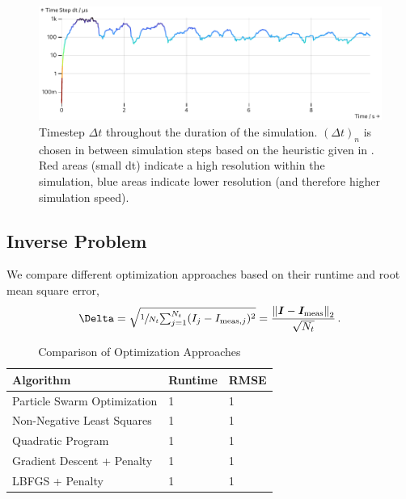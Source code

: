 \documentclass[USenglish,twocolumn]{article}
\begin{document}
  \begin{figure}
    \includegraphics[width=\columnwidth]{../figures/results/dt-plot.pdf}
    \caption{Timestep $\Delta t$ throughout the duration of the simulation. $(\Delta t)_n$ is chosen in between simulation steps based on the heuristic given in . Red areas (small dt) indicate a high resolution within the simulation, blue areas indicate lower resolution (and therefore higher simulation speed).}
    \label{figure:dt-plot}
  \end{figure}

  \subsection{Inverse Problem}
  We compare different optimization approaches based on their runtime and root mean square error,
  $$\Delta = \sqrt{\sfrac{1}{N_t} {\textstyle \sum_{j=1}^{N_t}} (I_j - I_{{\rm meas}, j})^2} = \frac{\norm{\vec{I} - \vec{I}_{\rm meas}}_2}{\sqrt{N_t}}\,.$$

  \begin{table}
    \caption{Comparison of Optimization Approaches}
    \begin{tabular}{lll}
      \textbf{Algorithm}                          & \textbf{Runtime} & \textbf{RMSE} \\
      \midrule
      Particle Swarm Optimization                 & 1                & 1             \\
      Non-Negative Least Squares \cite{1997-nnls} & 1                & 1             \\
      Quadratic Program                           & 1                & 1             \\
      Gradient Descent + Penalty                  & 1                & 1             \\
      LBFGS + Penalty                             & 1                & 1             \\
    \end{tabular}
    \label{table:optimization-comparison}
  \end{table}
\end{document}
